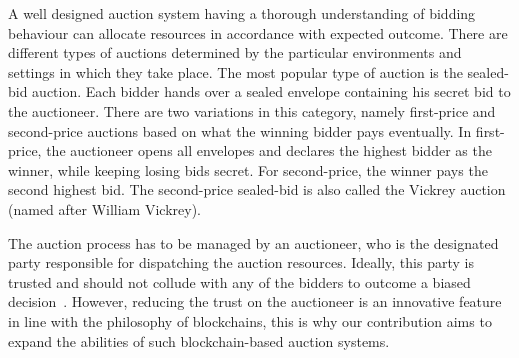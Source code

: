 A well designed auction system having a thorough understanding of bidding behaviour can allocate resources in accordance with expected outcome. There are different types of auctions determined by the  particular environments and settings in which they take place. The most popular type of auction is the sealed-bid auction. Each bidder hands over a sealed envelope containing his secret bid to the auctioneer. There are two variations in this category, namely first-price and second-price auctions based on what the winning bidder pays eventually. In first-price, the auctioneer opens all envelopes and declares the highest bidder as the winner, while keeping losing bids secret. For second-price, the winner pays the second highest bid. The second-price sealed-bid is also called the Vickrey auction (named after William Vickrey). 
% 

The auction process has to be managed by an auctioneer, who is the designated party responsible for dispatching the auction resources. Ideally, this party is trusted and should not collude with any of the bidders to outcome a biased decision~\cite{galal2018succinctly}. However, reducing the trust on the auctioneer is an innovative feature in line with the philosophy of blockchains, this is why our contribution aims to expand the abilities of such blockchain-based auction systems.

